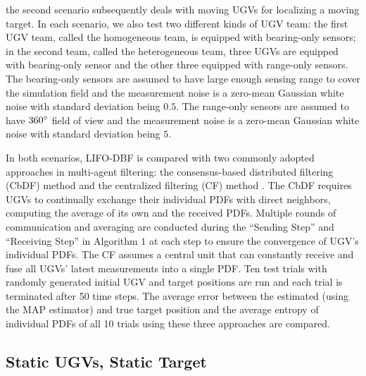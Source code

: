 \documentclass[journal]{IEEEtranTIE}
\theoremstyle{remark}
\begin{document}
the second scenario subsequently deals with moving UGVs for localizing a moving target. 
In each scenario, we also test two different kinds of UGV team: the first UGV team, called the homogeneous team, is equipped with bearing-only sensors; in the second team, called the heterogeneous team, three UGVs are equipped with bearing-only sensor and the other three equipped with range-only sensors.
The bearing-only sensors are assumed to have large enough sensing range to cover the simulation field and the measurement noise is a zero-mean Gaussian white noise with standard deviation being $0.5$.
The range-only sensors are assumed to have $360\degree$ field of view and the measurement noise is a zero-mean Gaussian white noise with standard deviation being $5$.

In both scenarios, LIFO-DBF is compared with two commonly adopted approaches in multi-agent filtering: the consensus-based distributed filtering (CbDF) method \cite{olfati2006belief} and the centralized filtering (CF) method \cite{veeravalli2012distributed}.
The CbDF requires UGVs to continually exchange their individual PDFs with direct neighbors, computing the average of its own and the received PDFs. 
Multiple rounds of communication and averaging are conducted during the ``Sending Step'' and ``Receiving Step'' in Algorithm $1$ at each step to ensure the convergence of UGV's individual PDFs.
The CF assumes a central unit that can constantly receive and fuse all UGVs' latest measurements into a single PDF.
Ten test trials with randomly generated initial UGV and target positions are run and each trial is terminated after 50 time steps.
The average error between the estimated (using the MAP estimator) and true target position and the average entropy of individual PDFs of all 10 trials using these three approaches are compared.


\subsection{Static UGVs, Static Target}
\end{document}

